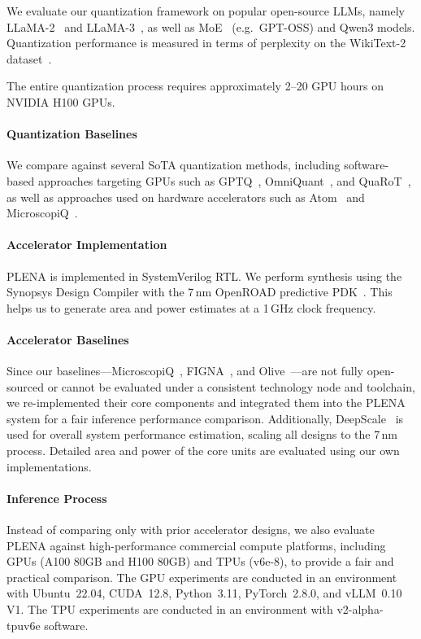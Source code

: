 We evaluate our quantization framework on popular open-source LLMs, namely LLaMA-2~\cite{llama2} and LLaMA-3~\cite{llama3}, as well as MoE~\cite{MoE} (e.g.~GPT-OSS) and Qwen3 models. Quantization performance is measured in terms of perplexity on the WikiText-2 dataset~\cite{wikitext2}.

The entire quantization process requires approximately 2–20 GPU hours on NVIDIA H100 GPUs. 

\paragraph{Quantization Baselines} 
We compare against several SoTA quantization methods, including software-based approaches targeting GPUs such as GPTQ~\cite{frantar2022gptq}, OmniQuant~\cite{shao2023omniquant}, and QuaRoT~\cite{QuaRot}, as well as approaches used on hardware accelerators such as Atom~\cite{zhao2024atom} and MicroscopiQ~\cite{Microscopiq}.

\paragraph{Accelerator Implementation} PLENA is implemented in SystemVerilog RTL. We perform synthesis using the Synopsys Design Compiler with the 7\,nm OpenROAD predictive PDK~\cite{openroad}. This helps us to generate area and power estimates at a 1\,GHz clock frequency. 


\paragraph{Accelerator Baselines} Since our baselines—MicroscopiQ~\cite{Microscopiq}, FIGNA~\cite{FIGNA}, and Olive~\cite{guo2023olive}—are not fully open-sourced or cannot be evaluated under a consistent technology node and toolchain, we re-implemented their core components and integrated them into the PLENA system for a fair inference performance comparison. Additionally, DeepScale~\cite{DeepScale} is used for overall system performance estimation, scaling all designs to the 7\,nm process. Detailed area and power of the core units are evaluated using our own implementations.

\paragraph{Inference Process}
Instead of comparing only with prior accelerator designs, we also evaluate PLENA against high-performance commercial compute platforms, including GPUs (A100 80GB and H100 80GB) and TPUs (v6e-8), to provide a fair and practical comparison. The GPU experiments are conducted in an environment with Ubuntu~22.04, CUDA~12.8, Python~3.11, PyTorch~2.8.0, and vLLM~0.10 V1. The TPU experiments are conducted in an environment with v2-alpha-tpuv6e software.

